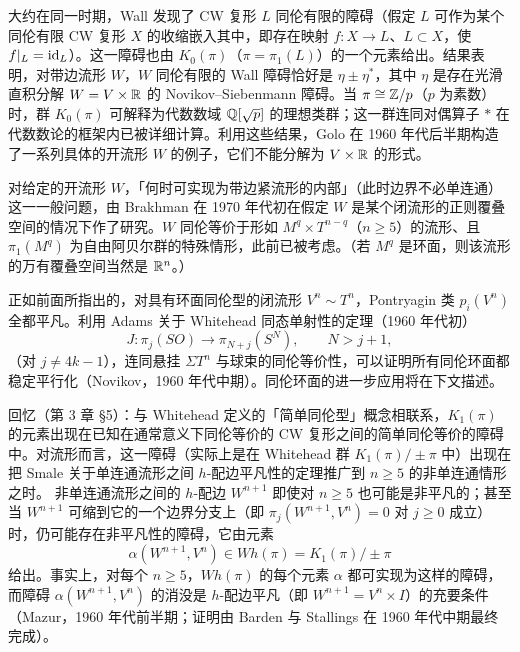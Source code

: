 大约在同一时期，Wall 发现了 CW 复形 $L$ 同伦有限的障碍（假定 $L$ 可作为某个同伦有限 CW 复形 $X$ 的收缩嵌入其中，即存在映射 $f\colon X\to L$、$L\subset X$，使 $f|_{L}=\mathrm{id}_{L}$）。这一障碍也由 $K_{0}(\pi)$（$\pi=\pi_{1}(L)$）的一个元素给出。结果表明，对带边流形 $W$，$W$ 同伦有限的 Wall 障碍恰好是 $\eta\pm\eta^{*}$，其中 $\eta$ 是存在光滑直积分解 $W=V\times\mathbb{R}$ 的 Novikov--Siebenmann 障碍。当 $\pi\cong\mathbb{Z}/p$（$p$ 为素数）时，群 $K_{0}(\pi)$ 可解释为代数数域 $\mathbb{Q}[\sqrt{p}]$ 的理想类群；这一群连同对偶算子 $*$ 在代数数论的框架内已被详细计算。利用这些结果，Golo 在 1960 年代后半期构造了一系列具体的开流形 $W$ 的例子，它们不能分解为 $V\times\mathbb{R}$ 的形式。

对给定的开流形 $W$，「何时可实现为带边紧流形的内部」（此时边界不必单连通）这一一般问题，由 Brakhman 在 1970 年代初在假定 $W$ 是某个闭流形的正则覆叠空间的情况下作了研究。$W$ 同伦等价于形如 $M^{q}\times T^{n-q}$（$n\ge 5$）的流形、且 $\pi_{1}(M^{q})$ 为自由阿贝尔群的特殊情形，此前已被考虑。（若 $M^{q}$ 是环面，则该流形的万有覆叠空间当然是 $\mathbb{R}^{n}$。）

正如前面所指出的，对具有环面同伦型的闭流形 $V^{n}\sim T^{n}$，Pontryagin 类 $p_{i}(V^{n})$ 全都平凡。利用 Adams 关于 Whitehead 同态单射性的定理（1960 年代初）
\[
J\colon\pi_{j}(SO)\to\pi_{N+j}(S^{N}),\qquad N>j+1,
\]
（对 $j\ne 4k-1$），连同悬挂 $\Sigma T^{n}$ 与球束的同伦等价性，可以证明所有同伦环面都稳定平行化（Novikov，1960 年代中期）。同伦环面的进一步应用将在下文描述。

回忆（第 3 章 §5）：与 Whitehead 定义的「简单同伦型」概念相联系，$K_{1}(\pi)$ 的元素出现在已知在通常意义下同伦等价的 CW 复形之间的简单同伦等价的障碍中。对流形而言，这一障碍（实际上是在 Whitehead 群 $K_{1}(\pi)/\pm\pi$ 中）出现在把 Smale 关于单连通流形之间 $h$-配边平凡性的定理推广到 $n\ge 5$ 的非单连通情形之时。
非单连通流形之间的 $h$-配边 $W^{n+1}$ 即使对 $n\ge 5$ 也可能是非平凡的；甚至当 $W^{n+1}$ 可缩到它的一个边界分支上（即 $\pi_{j}(W^{n+1},V^{n})=0$ 对 $j\ge 0$ 成立）时，仍可能存在非平凡性的障碍，它由元素
\begin{equation}
\alpha(W^{n+1},V^{n})\in Wh(\pi)=K_{1}(\pi)/\pm\pi \tag{5.12}
\end{equation}
给出。事实上，对每个 $n\ge 5$，$Wh(\pi)$ 的每个元素 $\alpha$ 都可实现为这样的障碍，而障碍 $\alpha(W^{n+1},V^{n})$ 的消没是 $h$-配边平凡（即 $W^{n+1}=V^{n}\times I$）的充要条件（Mazur，1960 年代前半期；证明由 Barden 与 Stallings 在 1960 年代中期最终完成）。%

